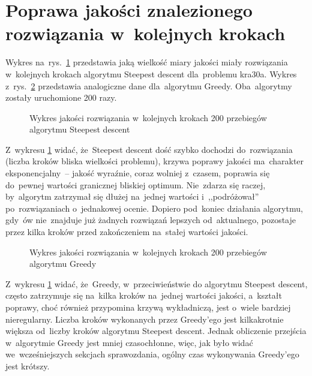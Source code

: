 \documentclass[a4paper,10pt]{article}
\begin{document}
\section{Poprawa jakości znalezionego rozwiązania w~kolejnych krokach}
Wykres na~rys.~\ref{fig:steephistkra30a} przedstawia jaką wielkość miary jakości miały rozwiązania w~kolejnych krokach
algorytmu Steepest descent dla~problemu kra30a. Wykres z~rys.~\ref{fig:greedyhistkra30a} przedstawia analogiczne dane
dla~algorytmu Greedy. Oba~algorytmy zostały uruchomione 200 razy.

\begin{figure}[!htpb]
\begin{center}

\caption{Wykres jakości rozwiązania w~kolejnych krokach 200 przebiegów algorytmu Steepest descent}
\label{fig:steephistkra30a}
\end{center}
\end{figure}

Z~wykresu \ref{fig:steephistkra30a} widać, że~Steepest descent dość szybko dochodzi do~rozwiązania (liczba kroków bliska wielkości problemu),
krzywa poprawy jakości ma~charakter eksponencjalny~-- jakość wyraźnie, coraz wolniej z~czasem,
poprawia się do~pewnej wartości granicznej bliskiej optimum. Nie~zdarza się raczej, by~algorytm zatrzymał się dłużej
na~jednej wartości i~,,podróżował'' po~rozwiązaniach o~jednakowej ocenie. Dopiero pod~koniec działania algorytmu, gdy~ów
nie~znajduje już żadnych rozwiązań lepszych od~aktualnego, pozostaje przez kilka kroków przed zakończeniem na~stałej
wartości jakości.

\begin{figure}[!htpb]
\begin{center}

\caption{Wykres jakości rozwiązania w~kolejnych krokach 200 przebiegów algorytmu Greedy}
\label{fig:greedyhistkra30a}
\end{center}
\end{figure}

Z~wykresu \ref{fig:steephistkra30a} widać, że~Greedy, w~przeciwieństwie do algorytmu Steepest descent, często
zatrzymuje się na~kilka kroków na~jednej wartości jakości, a~kształt poprawy, choć również przypomina krzywą wykładniczą, jest o~wiele
bardziej nieregularny. Liczba kroków wykonanych przez Greedy'ego jest kilkakrotnie większa od~liczby kroków algorytmu Steepest descent.
Jednak obliczenie przejścia w~algorytmie Greedy jest mniej czasochłonne, więc, jak było widać we~wcześniejszych sekcjach sprawozdania,
ogólny czas wykonywania Greedy'ego jest krótszy.
\end{document}
